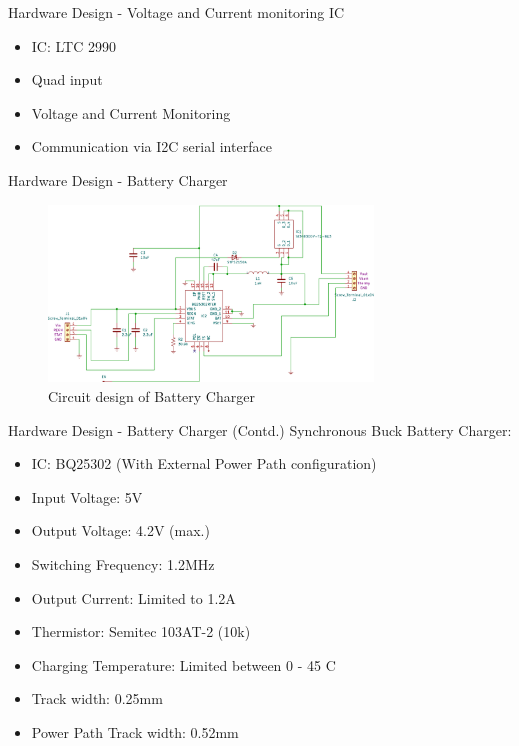 \documentclass[aspectratio=169]{beamer}
\begin{document}
		\begin{frame}{Hardware Design - Voltage and Current monitoring IC}
			
			\begin{itemize}
				\item IC: LTC 2990
				\item Quad input
				\item Voltage and Current Monitoring
				\item Communication via I2C serial interface
			\end{itemize}
		\end{frame}
		
		
		
		\begin{frame}{Hardware Design - Battery Charger }
			\begin{figure}[h]
				\centering
				\includegraphics[width=0.77\textwidth]{diag/charg.pdf}
				\caption{Circuit design of Battery Charger}
				\label{fig:mesh1}
			\end{figure}
		\end{frame}
		
		
		\begin{frame}{Hardware Design - Battery Charger (Contd.)}
			Synchronous Buck Battery Charger:
			\begin{itemize}
				\item IC: BQ25302 (With External Power Path configuration)
				\item Input Voltage: 5V
				\item Output Voltage: 4.2V (max.)
				\item Switching Frequency: 1.2MHz
				\item Output Current: Limited to 1.2A
				\item Thermistor: Semitec 103AT-2 (10k\ohm)
				\item Charging Temperature: Limited between 0 - 45 C
				\item Track width: 0.25mm
				\item Power Path Track width: 0.52mm
			\end{itemize}
		\end{frame}
		
\end{document}
